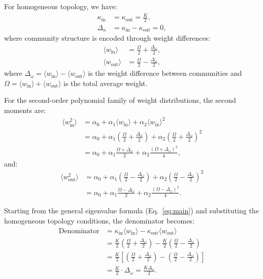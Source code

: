 \documentclass[a4paper,pre,superscriptaddress,floatfix,nofootinbib,twocolumn]{revtex4-1}
\begin{document}
For homogeneous topology, we have:
\begin{align*}
\kappa_\text{in} &= \kappa_\text{out} = \frac{K}{2},\\
\Delta_\kappa &= \kappa_\text{in} - \kappa_\text{out} = 0,
\end{align*}
where community structure is encoded through weight differences:
\begin{align*}
\langle w_\text{in} \rangle &= \frac{\Omega}{2} + \frac{\Delta_\omega}{2},\\
\langle w_\text{out} \rangle &= \frac{\Omega}{2} - \frac{\Delta_\omega}{2},
\end{align*}
where $\Delta_\omega = \langle w_\text{in} \rangle - \langle w_\text{out} \rangle$ is the weight difference between communities and $\Omega = \langle w_\text{in} \rangle + \langle w_\text{out} \rangle$ is the total average weight.

For the second-order polynomial family of weight distributions, the second moments are:
\begin{align*}
\langle w^2_\text{in} \rangle &= \alpha_0 + \alpha_1 \langle w_\text{in} \rangle + \alpha_2 \langle w_\text{in} \rangle^2\\
&= \alpha_0 + \alpha_1 \left(\frac{\Omega}{2} + \frac{\Delta_\omega}{2}\right) + \alpha_2 \left(\frac{\Omega}{2} + \frac{\Delta_\omega}{2}\right)^2\\
&= \alpha_0 + \alpha_1 \frac{\Omega + \Delta_\omega}{2} + \alpha_2 \frac{(\Omega + \Delta_\omega)^2}{4},
\end{align*}
and:
\begin{align*}
\langle w^2_\text{out} \rangle &= \alpha_0 + \alpha_1 \left(\frac{\Omega}{2} - \frac{\Delta_\omega}{2}\right) + \alpha_2 \left(\frac{\Omega}{2} - \frac{\Delta_\omega}{2}\right)^2\\
&= \alpha_0 + \alpha_1 \frac{\Omega - \Delta_\omega}{2} + \alpha_2 \frac{(\Omega - \Delta_\omega)^2}{4}.
\end{align*}

Starting from the general eigenvalue formula (Eq.~\eqref{eq:main}) and substituting the homogeneous topology conditions, the denominator becomes:
\begin{align*}
\text{Denominator} &= \kappa_\text{in} \langle w_\text{in} \rangle - \kappa_\text{out} \langle w_\text{out} \rangle\\
&= \frac{K}{2} \left(\frac{\Omega}{2} + \frac{\Delta_\omega}{2}\right) - \frac{K}{2} \left(\frac{\Omega}{2} - \frac{\Delta_\omega}{2}\right)\\
&= \frac{K}{2} \left[\left(\frac{\Omega}{2} + \frac{\Delta_\omega}{2}\right) - \left(\frac{\Omega}{2} - \frac{\Delta_\omega}{2}\right)\right]\\
&= \frac{K}{2} \cdot \Delta_\omega = \frac{K\Delta_\omega}{2}.
\end{align*}
\end{document}
